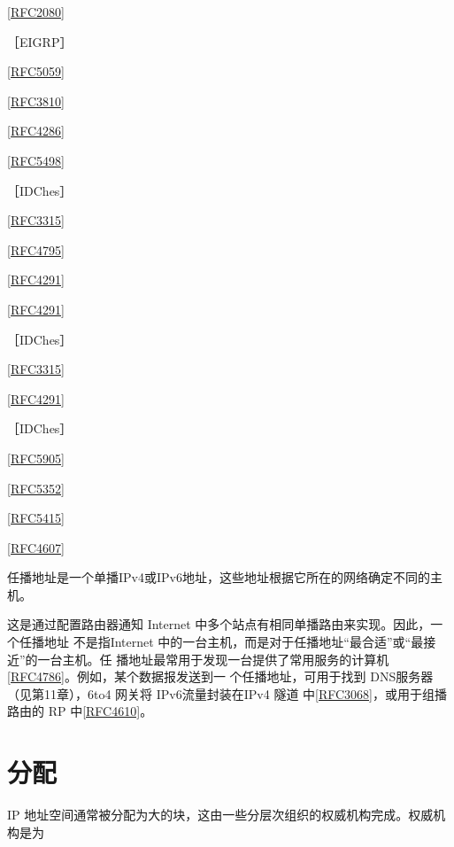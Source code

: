 \href{https://www.rfc-editor.org/rfc/rfc2080}{[RFC2080]}

［EIGRP］

\href{https://www.rfc-editor.org/rfc/rfc5059}{[RFC5059]}

\href{https://www.rfc-editor.org/rfc/rfc3810}{[RFC3810]}

\href{https://www.rfc-editor.org/rfc/rfc4286}{[RFC4286]}

\href{https://www.rfc-editor.org/rfc/rfc5498}{[RFC5498]}

［IDChes］

\href{https://www.rfc-editor.org/rfc/rfc3315}{[RFC3315]}

\href{https://www.rfc-editor.org/rfc/rfc4795}{[RFC4795]}

\href{https://www.rfc-editor.org/rfc/rfc4291}{[RFC4291]}

\href{https://www.rfc-editor.org/rfc/rfc4291}{[RFC4291]}

［IDChes］

\href{https://www.rfc-editor.org/rfc/rfc3315}{[RFC3315]}

\href{https://www.rfc-editor.org/rfc/rfc4291}{[RFC4291]}

［IDChes］

\href{https://www.rfc-editor.org/rfc/rfc5905}{[RFC5905]}

\href{https://www.rfc-editor.org/rfc/rfc5352}{[RFC5352]}

\href{https://www.rfc-editor.org/rfc/rfc5415}{[RFC5415]}

\href{https://www.rfc-editor.org/rfc/rfc4607}{[RFC4607]}

任播地址是一个单播IPv4或IPv6地址，这些地址根据它所在的网络确定不同的主机。

这是通过配置路由器通知 Internet 中多个站点有相同单播路由来实现。因此，一个任播地址
不是指Internet 中的一台主机，而是对于任播地址“最合适”或“最接近”的一台主机。任
播地址最常用于发现一台提供了常用服务的计算机\href{https://www.rfc-editor.org/rfc/rfc4786}{[RFC4786]}。例如，某个数据报发送到一
个任播地址，可用于找到 DNS服务器（见第11章），6to4 网关将 IPv6流量封装在IPv4 隧道
中\href{https://www.rfc-editor.org/rfc/rfc3068}{[RFC3068]}，或用于组播路由的 RP 中\href{https://www.rfc-editor.org/rfc/rfc4610}{[RFC4610]}。

\section{分配}
IP 地址空间通常被分配为大的块，这由一些分层次组织的权威机构完成。权威机构是为

